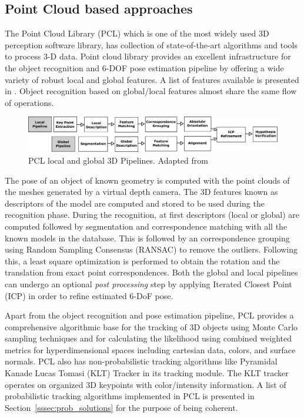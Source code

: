 \subsection{Point Cloud based approaches}
\label{ssec:pcl}
The Point Cloud Library (PCL) \cite{rusu20113d} which is one of the most widely used 3D perception software library, has collection of state-of-the-art algorithms and tools to process 3-D data. 
	Point cloud library provides an excellent infrastructure for the object recognition and 6-DOF pose estimation pipeline by offering a wide variety of robust local and global features. A list of features available is presented in \cite{aldoma2012point}. Object recognition based on global/local features almost share the same flow of operations. 
\begin{figure}[H]
\centering
\includegraphics[width=1\textwidth]{assets/pcl_pipeline.eps}
\caption[PCL local and global 3D Pipelines]{PCL local and global 3D Pipelines. {Adapted from \cite{aldoma2012point}}}
\label{fig:pcl_pipeline}
\end{figure}
The pose of an object of known geometry is computed with the point clouds of the meshes generated by a virtual depth camera. The 3D features known as descriptors of the model are computed and stored to be used during the recognition phase.  During the recognition, at first descriptors (local or global) are computed followed by segmentation and correspondence matching with all the known models in the database. This is followed by an correspondence grouping using Random Sampling Consensus (RANSAC) to remove the outliers. Following this, a least square optimization is performed to obtain the rotation and the translation from exact point correspondences. Both the global and local pipelines can undergo an optional \emph{post processing} step by applying Iterated Closest Point (ICP) in order to refine estimated 6-DoF pose.

Apart from the object recognition and pose estimation pipeline, PCL provides a comprehensive algorithmic base for the tracking of 3D objects using Monte Carlo sampling techniques \cite{RUeda2012} and for calculating the likelihood using combined weighted metrics for hyperdimensional spaces including cartesian data, colors, and surface normals. PCL also has non-probabilistic tracking algorithms like Pyramidal Kanade Lucas Tomasi (KLT) Tracker in its tracking module. The KLT tracker operates on organized 3D keypoints with color/intensity information. A list of probabilistic tracking algorithms implemented in PCL is presented in Section~\ref{sssec:prob_solutions} for the purpose of being coherent.
